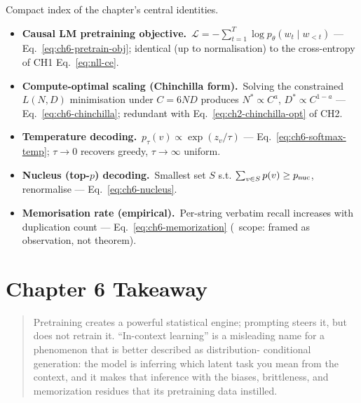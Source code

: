 \begin{derivledger}
Compact index of the chapter's central identities.
\begin{itemize}
  \item \textbf{Causal LM pretraining objective.}\
        $\mathcal{L} = -\sum_{t=1}^{T} \log p_\theta(w_t \mid w_{<t})$
        --- Eq.~\eqref{eq:ch6-pretrain-obj}; identical (up to
        normalisation) to the cross-entropy of CH1
        Eq.~\eqref{eq:nll-ce}.
  \item \textbf{Compute-optimal scaling (Chinchilla form).}\
        Solving the constrained $L(N, D)$ minimisation under
        $C = 6ND$ produces $N^* \propto C^a$, $D^* \propto C^{1-a}$
        --- Eq.~\eqref{eq:ch6-chinchilla}; redundant with
        Eq.~\eqref{eq:ch2-chinchilla-opt} of CH2.
  \item \textbf{Temperature decoding.}\
        $p_\tau(v) \propto \exp(z_v / \tau)$
        --- Eq.~\eqref{eq:ch6-softmax-temp};
        $\tau \to 0$ recovers greedy, $\tau \to \infty$ uniform.
  \item \textbf{Nucleus (top-$p$) decoding.}\
        Smallest set $S$ s.t. $\sum_{v \in S} p(v) \ge p_{\rm nuc}$,
        renormalise --- Eq.~\eqref{eq:ch6-nucleus}.
  \item \textbf{Memorisation rate (empirical).}\
        Per-string verbatim recall increases with duplication count
        --- Eq.~\eqref{eq:ch6-memorization} (\Emp\ scope: framed
        as observation, not theorem).
\end{itemize}
\end{derivledger}

\section{Chapter 6 Takeaway}

\begin{quote}
Pretraining creates a powerful statistical engine; prompting steers
it, but does not retrain it. ``In-context learning'' is a misleading
name for a phenomenon that is better described as distribution-
conditional generation: the model is inferring which latent task you
mean from the context, and it makes that inference with the
biases, brittleness, and memorization residues that its pretraining
data instilled.
\end{quote}
